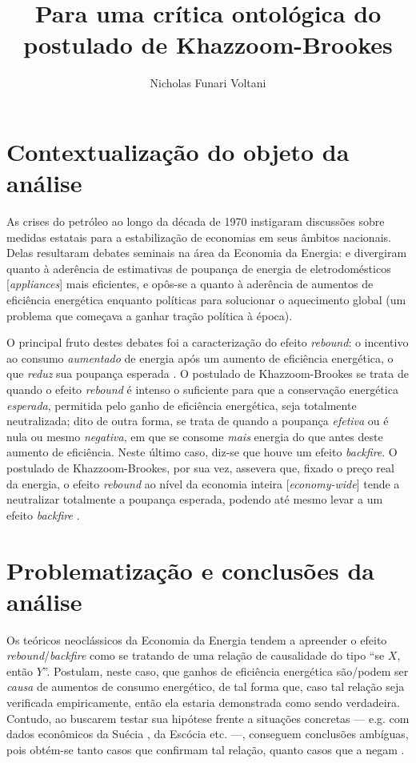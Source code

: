 \documentclass[12pt]{article}
\title{Para uma crítica ontológica do postulado de Khazzoom-Brookes}
\author{Nicholas Funari Voltani}
\date{}
\begin{document}
\maketitle

\section{Contextualização do objeto da análise}
As crises do petróleo ao longo da década de 1970 instigaram discussões sobre medidas estatais para a estabilização de economias em seus âmbitos nacionais. Delas resultaram debates seminais na área da Economia da Energia: \textcite{Khazzoom1980,Khazzoom1987} e \textcite{Lovins1988} divergiram quanto à aderência de estimativas de poupança de energia de eletrodomésticos [\textit{appliances}] mais eficientes, e \textcite{Brookes1990,Brookes1992,Brookes1993} opôs-se a \textcite{Keepin1988,Keepin1989,Jones1989,Grubb1990,Grubb1992} quanto à aderência de aumentos de eficiência energética enquanto políticas para solucionar o aquecimento global (um problema que começava a ganhar tração política à época). 

O principal fruto destes debates foi a caracterização do efeito \textit{rebound}: o incentivo ao consumo \textit{aumentado} de energia após um aumento de eficiência energética, o que \textit{reduz} sua poupança esperada \parencite{Khazzoom1980,Brookes1990,Saunders2000,Saunders2009,Berkhout2000}. O postulado de Khazzoom-Brookes se trata de quando o efeito \textit{rebound} é intenso o suficiente para que a conservação energética \textit{esperada}, permitida pelo ganho de eficiência energética, seja totalmente neutralizada; dito de outra forma, se trata de quando a poupança \textit{efetiva} ou é nula ou mesmo \textit{negativa}, em que se consome \textit{mais} energia do que antes deste aumento de eficiência. Neste último caso, diz-se que houve um efeito \textit{backfire}. O postulado de Khazzoom-Brookes, por sua vez, assevera que, fixado o preço real da energia, o efeito \textit{rebound} ao nível da economia inteira [\textit{economy-wide}] tende a neutralizar totalmente a poupança esperada, podendo até mesmo levar a um efeito \textit{backfire} \parencite{Saunders1992,Saunders2000,Sorrell2009}.

\section{Problematização e conclusões da análise}
Os teóricos neoclássicos da Economia da Energia tendem a apreender o efeito \textit{rebound}/\textit{backfire} como se tratando de uma relação de causalidade do tipo ``se $X$, então $Y$''. Postulam, neste caso, que ganhos de eficiência energética são/podem ser \textit{causa} de aumentos de consumo energético, de tal forma que, caso tal relação seja verificada empiricamente, então ela estaria demonstrada como sendo verdadeira. Contudo, ao buscarem testar sua hipótese frente a situações concretas --- e.g. com dados econômicos da Suécia \parencite{Bergman1988}, da Escócia \parencite{Hanley2009} etc. ---, conseguem conclusões ambíguas, pois obtém-se tanto casos que confirmam tal relação, quanto casos que a negam \parencite{Greening2000,Sorrell2007}. 
\end{document}
